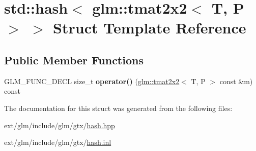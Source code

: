 \hypertarget{structstd_1_1hash_3_01glm_1_1tmat2x2_3_01_t_00_01_p_01_4_01_4}{\section{std\-:\-:hash$<$ glm\-:\-:tmat2x2$<$ T, P $>$ $>$ Struct Template Reference}
\label{structstd_1_1hash_3_01glm_1_1tmat2x2_3_01_t_00_01_p_01_4_01_4}
}
\subsection*{Public Member Functions}
\begin{DoxyCompactItemize}
\item 
\hypertarget{structstd_1_1hash_3_01glm_1_1tmat2x2_3_01_t_00_01_p_01_4_01_4_a10b5a4394414790d04af563b6c85d036}{G\-L\-M\-\_\-\-F\-U\-N\-C\-\_\-\-D\-E\-C\-L size\-\_\-t {\bfseries operator()} (\hyperlink{structglm_1_1tmat2x2}{glm\-::tmat2x2}$<$ T, P $>$ const \&m) const }\label{structstd_1_1hash_3_01glm_1_1tmat2x2_3_01_t_00_01_p_01_4_01_4_a10b5a4394414790d04af563b6c85d036}

\end{DoxyCompactItemize}


The documentation for this struct was generated from the following files\-:\begin{DoxyCompactItemize}
\item 
ext/glm/include/glm/gtx/\hyperlink{hash_8hpp}{hash.\-hpp}\item 
ext/glm/include/glm/gtx/\hyperlink{hash_8inl}{hash.\-inl}\end{DoxyCompactItemize}
